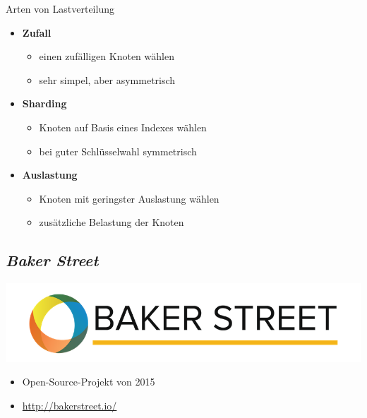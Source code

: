 \documentclass{beamer}
\begin{document}
\begin{frame}{Arten von Lastverteilung}
	\begin{itemize}[<+->]
		\setlength\itemsep{1em}
		\item \textbf{Zufall} 
		\begin{itemize}
			\item einen zufälligen Knoten wählen
			\item sehr simpel, aber asymmetrisch
		\end{itemize}
		\item \textbf{Sharding} 
		\begin{itemize}
			\item Knoten auf Basis eines Indexes wählen
			\item bei guter Schlüsselwahl symmetrisch
		\end{itemize}
		\item \textbf{Auslastung} 
		\begin{itemize}
			\item Knoten mit geringster Auslastung wählen
			\item zusätzliche Belastung der Knoten
		\end{itemize}
	\end{itemize}
\end{frame}

\subsection{\em Baker Street}
\begin{frame}{\insertsubsection}
	\centering
	\includegraphics[width=\linewidth]{img/bakerstreet}
	\begin{itemize}
		\item Open-Source-Projekt von 2015
		\item \url{http://bakerstreet.io/}
	\end{itemize}
\end{frame}
\end{document}
